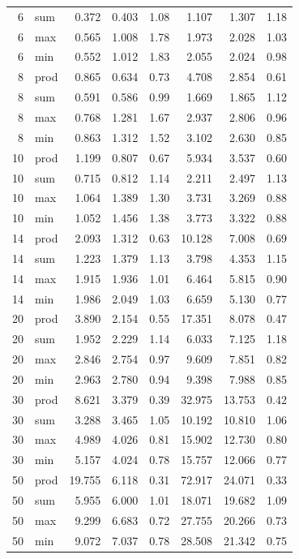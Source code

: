 \documentclass[11pt]{article}
\begin{document}
\begin{table}[H]
\begin{tabular}{@{}rlrrrrrr@{}}
        6 & sum & 0.372 & 0.403 & 1.08 & 1.107 & 1.307 & 1.18 \\
        6 & max & 0.565 & 1.008 & 1.78 & 1.973 & 2.028 & 1.03 \\
        6 & min & 0.552 & 1.012 & 1.83 & 2.055 & 2.024 & 0.98 \\
        8 & prod & 0.865 & 0.634 & 0.73 & 4.708 & 2.854 & 0.61 \\
        8 & sum & 0.591 & 0.586 & 0.99 & 1.669 & 1.865 & 1.12 \\
        8 & max & 0.768 & 1.281 & 1.67 & 2.937 & 2.806 & 0.96 \\
        8 & min & 0.863 & 1.312 & 1.52 & 3.102 & 2.630 & 0.85 \\
        10 & prod & 1.199 & 0.807 & 0.67 & 5.934 & 3.537 & 0.60 \\
        10 & sum & 0.715 & 0.812 & 1.14 & 2.211 & 2.497 & 1.13 \\
        10 & max & 1.064 & 1.389 & 1.30 & 3.731 & 3.269 & 0.88 \\
        10 & min & 1.052 & 1.456 & 1.38 & 3.773 & 3.322 & 0.88 \\
        14 & prod & 2.093 & 1.312 & 0.63 & 10.128 & 7.008 & 0.69 \\
        14 & sum & 1.223 & 1.379 & 1.13 & 3.798 & 4.353 & 1.15 \\
        14 & max & 1.915 & 1.936 & 1.01 & 6.464 & 5.815 & 0.90 \\
        14 & min & 1.986 & 2.049 & 1.03 & 6.659 & 5.130 & 0.77 \\
        20 & prod & 3.890 & 2.154 & 0.55 & 17.351 & 8.078 & 0.47 \\
        20 & sum & 1.952 & 2.229 & 1.14 & 6.033 & 7.125 & 1.18 \\
        20 & max & 2.846 & 2.754 & 0.97 & 9.609 & 7.851 & 0.82 \\
        20 & min & 2.963 & 2.780 & 0.94 & 9.398 & 7.988 & 0.85 \\
        30 & prod & 8.621 & 3.379 & 0.39 & 32.975 & 13.753 & 0.42 \\
        30 & sum & 3.288 & 3.465 & 1.05 & 10.192 & 10.810 & 1.06 \\
        30 & max & 4.989 & 4.026 & 0.81 & 15.902 & 12.730 & 0.80 \\
        30 & min & 5.157 & 4.024 & 0.78 & 15.757 & 12.066 & 0.77 \\
        50 & prod & 19.755 & 6.118 & 0.31 & 72.917 & 24.071 & 0.33 \\
        50 & sum & 5.955 & 6.000 & 1.01 & 18.071 & 19.682 & 1.09 \\
        50 & max & 9.299 & 6.683 & 0.72 & 27.755 & 20.266 & 0.73 \\
        50 & min & 9.072 & 7.037 & 0.78 & 28.508 & 21.342 & 0.75 \\
\bottomrule
\end{tabular}
\end{table}
\end{document}
